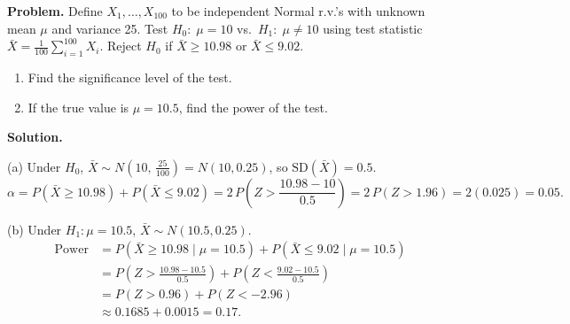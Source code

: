 \documentclass[10pt]{report}
\begin{document}
\begin{hwbox}
\textbf{Problem.} Define $X_1, \ldots, X_{100}$ to be independent Normal r.v.'s with unknown mean $\mu$ and variance 25. Test $H_0{:}\; \mu = 10$ vs.\ $H_1{:}\; \mu \neq 10$ using test statistic $\bar{X} = \frac{1}{100}\sum_{i=1}^{100} X_i$. Reject $H_0$ if $\bar{X} \geq 10.98$ or $\bar{X} \leq 9.02$.

\begin{enumerate}[label=(\alph*)]
  \item Find the significance level of the test.
  \item If the true value is $\mu = 10.5$, find the power of the test.
\end{enumerate}

\textbf{Solution.}

(a) Under $H_0$, $\bar{X} \sim N\!\left(10,\, \frac{25}{100}\right) = N(10, 0.25)$, so $\text{SD}(\bar{X}) = 0.5$.
\[
\alpha = P(\bar{X} \geq 10.98) + P(\bar{X} \leq 9.02) = 2\,P\!\left(Z > \frac{10.98-10}{0.5}\right) = 2\,P(Z > 1.96) = 2(0.025) = \boxed{0.05.}
\]

(b) Under $H_1\colon \mu = 10.5$, $\bar{X} \sim N(10.5, 0.25)$.
\begin{align*}
\text{Power} &= P(\bar{X} \geq 10.98 \mid \mu=10.5) + P(\bar{X} \leq 9.02 \mid \mu=10.5) \\
&= P\!\left(Z > \frac{10.98 - 10.5}{0.5}\right) + P\!\left(Z < \frac{9.02 - 10.5}{0.5}\right) \\
&= P(Z > 0.96) + P(Z < -2.96) \\
&\approx 0.1685 + 0.0015 = \boxed{0.17.}
\end{align*}
\end{hwbox}
\end{document}
